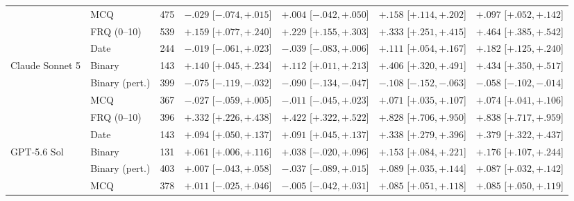 \begin{table}[p]
\begin{tabular}{l l r c c c c}
& MCQ
& 475
& $-.029$ {\tiny[$-.074,+.015$]}
& $+.004$ {\tiny[$-.042,+.050$]}
& $+.158$ {\tiny[$+.114,+.202$]}
& $+.097$ {\tiny[$+.052,+.142$]} \\


& FRQ (0--10)
& 539
& $+.159$ {\tiny[$+.077,+.240$]}
& $+.229$ {\tiny[$+.155,+.303$]}
& $+.333$ {\tiny[$+.251,+.415$]}
& $+.464$ {\tiny[$+.385,+.542$]} \\


& Date
& 244
& $-.019$ {\tiny[$-.061,+.023$]}
& $-.039$ {\tiny[$-.083,+.006$]}
& $+.111$ {\tiny[$+.054,+.167$]}
& $+.182$ {\tiny[$+.125,+.240$]} \\

\addlinespace

Claude Sonnet 5
& Binary
& 143
& $+.140$ {\tiny[$+.045,+.234$]}
& $+.112$ {\tiny[$+.011,+.213$]}
& $+.406$ {\tiny[$+.320,+.491$]}
& $+.434$ {\tiny[$+.350,+.517$]} \\


& Binary (pert.)
& 399
& $-.075$ {\tiny[$-.119,-.032$]}
& $-.090$ {\tiny[$-.134,-.047$]}
& $-.108$ {\tiny[$-.152,-.063$]}
& $-.058$ {\tiny[$-.102,-.014$]} \\


& MCQ
& 367
& $-.027$ {\tiny[$-.059,+.005$]}
& $-.011$ {\tiny[$-.045,+.023$]}
& $+.071$ {\tiny[$+.035,+.107$]}
& $+.074$ {\tiny[$+.041,+.106$]} \\


& FRQ (0--10)
& 396
& $+.332$ {\tiny[$+.226,+.438$]}
& $+.422$ {\tiny[$+.322,+.522$]}
& $+.828$ {\tiny[$+.706,+.950$]}
& $+.838$ {\tiny[$+.717,+.959$]} \\


& Date
& 143
& $+.094$ {\tiny[$+.050,+.137$]}
& $+.091$ {\tiny[$+.045,+.137$]}
& $+.338$ {\tiny[$+.279,+.396$]}
& $+.379$ {\tiny[$+.322,+.437$]} \\

\addlinespace

GPT-5.6 Sol
& Binary
& 131
& $+.061$ {\tiny[$+.006,+.116$]}
& $+.038$ {\tiny[$-.020,+.096$]}
& $+.153$ {\tiny[$+.084,+.221$]}
& $+.176$ {\tiny[$+.107,+.244$]} \\


& Binary (pert.)
& 403
& $+.007$ {\tiny[$-.043,+.058$]}
& $-.037$ {\tiny[$-.089,+.015$]}
& $+.089$ {\tiny[$+.035,+.144$]}
& $+.087$ {\tiny[$+.032,+.142$]} \\


& MCQ
& 378
& $+.011$ {\tiny[$-.025,+.046$]}
& $-.005$ {\tiny[$-.042,+.031$]}
& $+.085$ {\tiny[$+.051,+.118$]}
& $+.085$ {\tiny[$+.050,+.119$]} \\



\end{tabular}
\end{table}

